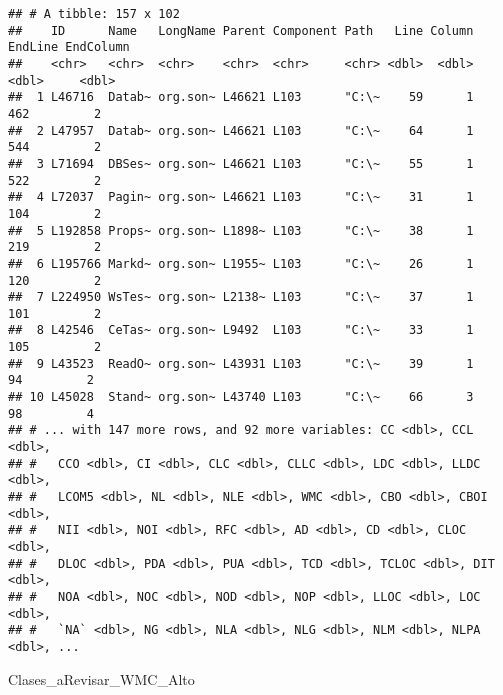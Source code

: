 \documentclass[
]{article}
\newenvironment{Shaded}{\begin{snugshade}}{\end{snugshade}}
\newcommand{\NormalTok}[1]{#1}
\begin{document}
\begin{verbatim}
## # A tibble: 157 x 102
##    ID      Name   LongName Parent Component Path   Line Column EndLine EndColumn
##    <chr>   <chr>  <chr>    <chr>  <chr>     <chr> <dbl>  <dbl>   <dbl>     <dbl>
##  1 L46716  Datab~ org.son~ L46621 L103      "C:\~    59      1     462         2
##  2 L47957  Datab~ org.son~ L46621 L103      "C:\~    64      1     544         2
##  3 L71694  DBSes~ org.son~ L46621 L103      "C:\~    55      1     522         2
##  4 L72037  Pagin~ org.son~ L46621 L103      "C:\~    31      1     104         2
##  5 L192858 Props~ org.son~ L1898~ L103      "C:\~    38      1     219         2
##  6 L195766 Markd~ org.son~ L1955~ L103      "C:\~    26      1     120         2
##  7 L224950 WsTes~ org.son~ L2138~ L103      "C:\~    37      1     101         2
##  8 L42546  CeTas~ org.son~ L9492  L103      "C:\~    33      1     105         2
##  9 L43523  ReadO~ org.son~ L43931 L103      "C:\~    39      1      94         2
## 10 L45028  Stand~ org.son~ L43740 L103      "C:\~    66      3      98         4
## # ... with 147 more rows, and 92 more variables: CC <dbl>, CCL <dbl>,
## #   CCO <dbl>, CI <dbl>, CLC <dbl>, CLLC <dbl>, LDC <dbl>, LLDC <dbl>,
## #   LCOM5 <dbl>, NL <dbl>, NLE <dbl>, WMC <dbl>, CBO <dbl>, CBOI <dbl>,
## #   NII <dbl>, NOI <dbl>, RFC <dbl>, AD <dbl>, CD <dbl>, CLOC <dbl>,
## #   DLOC <dbl>, PDA <dbl>, PUA <dbl>, TCD <dbl>, TCLOC <dbl>, DIT <dbl>,
## #   NOA <dbl>, NOC <dbl>, NOD <dbl>, NOP <dbl>, LLOC <dbl>, LOC <dbl>,
## #   `NA` <dbl>, NG <dbl>, NLA <dbl>, NLG <dbl>, NLM <dbl>, NLPA <dbl>, ...
\end{verbatim}

\begin{Shaded}
\begin{Highlighting}[]
\NormalTok{Clases\_aRevisar\_WMC\_Alto}
\end{Highlighting}
\end{Shaded}
\end{document}
